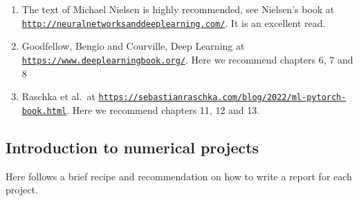 \documentclass[%
oneside,                 %
final,                   %
10pt]{article}
\begin{document}
\begin{enumerate}
\item The text of Michael Nielsen is highly recommended, see Nielsen's book at \href{{http://neuralnetworksanddeeplearning.com/}}{\nolinkurl{http://neuralnetworksanddeeplearning.com/}}. It is an excellent read.

\item Goodfellow, Bengio and Courville, Deep Learning at \href{{https://www.deeplearningbook.org/}}{\nolinkurl{https://www.deeplearningbook.org/}}. Here we recommend chapters 6, 7 and 8

\item Raschka et al.~at \href{{https://sebastianraschka.com/blog/2022/ml-pytorch-book.html}}{\nolinkurl{https://sebastianraschka.com/blog/2022/ml-pytorch-book.html}}. Here we recommend chapters 11, 12 and 13.
\end{enumerate}

\noindent
\subsection{Introduction to numerical projects}

Here follows a brief recipe and recommendation on how to write a report for each
project.
\end{document}
